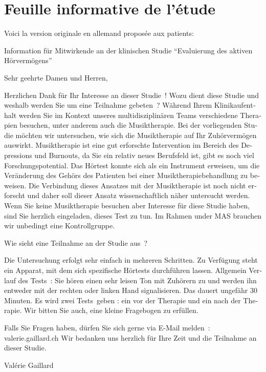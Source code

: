 \section{Feuille informative de l'étude}
Voici la version originale en allemand proposée aux patients:
\begin{german}

Information für Mitwirkende an der klinischen Studie
\foreignquote{german}{Evaluierung des aktiven Hörvermögens}

Sehr geehrte Damen und Herren,


Herzlichen Dank für Ihr Interesse an dieser Studie !
Wozu dient diese Studie und weshalb werden Sie um eine Teilnahme gebeten ?
Während Ihrem Klinikaufenthalt  werden Sie im Kontext
unseres multidisziplinären Teams verschiedene Therapien besuchen, unter anderem auch die Musiktherapie. Bei der vorliegenden Studie möchten wir untersuchen, wie sich die Musiktherapie auf Ihr Zuhörvermögen auswirkt.
Musiktherapie ist eine gut erforschte Intervention im Bereich des Depressions und Burnouts, da Sie ein relativ neues Berufsfeld ist, gibt es noch viel Forschungspotential.
Das Hörtest konnte sich als ein Instrument erweisen, um die Veränderung des Gehörs des Patienten bei einer Musiktherapiebehandlung zu beweisen. Die Verbindung dieses Ansatzes mit der Musiktherapie ist noch nicht erforscht und daher soll dieser Ansatz wissenschaftlich näher untersucht werden.
Wenn Sie keine Musiktherapie besuchen aber Interesse für diese Studie haben, sind Sie herzlich eingeladen, dieses Test zu tun. Im Rahmen under MAS brauchen wir unbedingt eine Kontrollgruppe.

Wie sieht eine Teilnahme an der Studie aus ?

Die Untersuchung erfolgt sehr einfach in mehreren Schritten.
Zu Verfügung steht ein Apparat, mit dem sich spezifische Hörtests durchführen lassen.
Allgemein Verlauf des Tests :
Sie hören einen sehr leisen Ton mit Zuhörern zu und werden ihn entweder mit der rechten  oder linken Hand  signalisieren. Das dauert ungefähr 30 Minuten.
Es wird zwei Tests geben : ein vor der Therapie und ein nach der Therapie.
Wir bitten Sie auch, eine kleine Fragebogen zu erfüllen.

Falls Sie Fragen haben, dürfen Sie sich gerne via E-Mail melden : valerie.gaillard\@gmx.ch
Wir bedanken uns herzlich für Ihre Zeit und die Teilnahme an dieser Studie.

\end{german}
Valérie Gaillard



